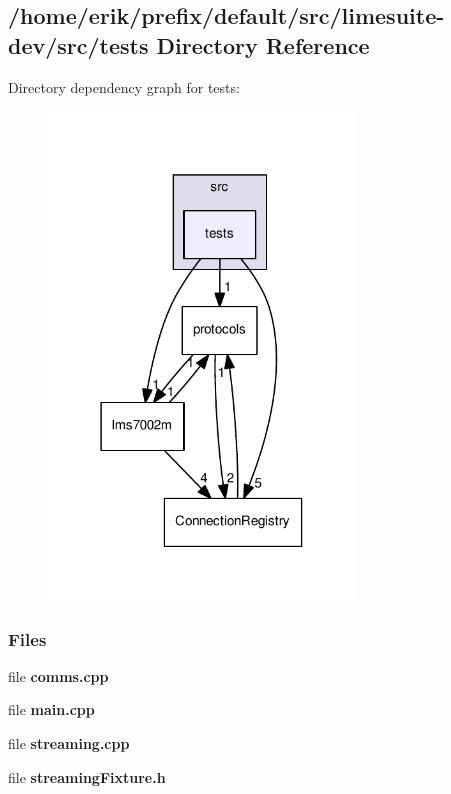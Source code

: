 \subsection{/home/erik/prefix/default/src/limesuite-\/dev/src/tests Directory Reference}
\label{dir_8967c931996746a66c78764b1980994e}
Directory dependency graph for tests\+:
\nopagebreak
\begin{figure}[H]
\begin{center}
\leavevmode
\includegraphics[width=231pt]{dir_8967c931996746a66c78764b1980994e_dep}
\end{center}
\end{figure}
\subsubsection*{Files}
\begin{DoxyCompactItemize}
\item 
file {\bf comms.\+cpp}
\item 
file {\bf main.\+cpp}
\item 
file {\bf streaming.\+cpp}
\item 
file {\bf streaming\+Fixture.\+h}
\end{DoxyCompactItemize}

